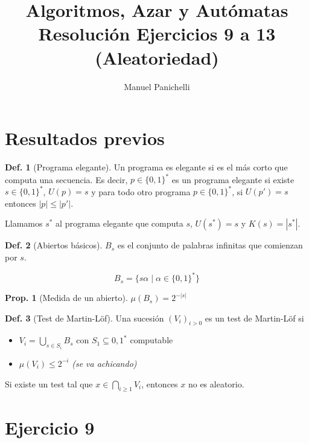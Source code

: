 \documentclass{article}
\author{Manuel Panichelli}
\title{Algoritmos, Azar y Autómatas\\Resolución Ejercicios 9 a 13 (Aleatoriedad)}
\theoremstyle{definition} %
\newtheorem{proposition}{Prop.}
\newtheorem{definition}{Def.}
\newcommand{\measure}[1]{\mu\left(#1\right)}
\newcommand{\sucML}{(V_i)_{i > 0}}
\newcommand{\ZOalphabet}{\{0, 1\}^*}
\begin{document}
\maketitle

\section*{Resultados previos}

\begin{definition}[Programa elegante]\label{def:prog-elegante}
    Un programa es elegante si es el más corto que computa una secuencia. Es
    decir, $p \in \ZOalphabet$ es un programa elegante si existe $s \in
    \ZOalphabet$, $U(p) = s$ y para todo otro programa $p \in \ZOalphabet$, si
    $U(p') = s$ entonces $|p| \leq |p'|$.

    Llamamos $s^*$ al programa elegante que computa $s$, $U(s^*) = s$ y $K(s) = |s^*|$.
\end{definition}

\begin{definition}[Abiertos básicos]
    $B_s$ es el conjunto de palabras infinitas que comienzan por $s$.

    \[B_s = \{ s \alpha \mid \alpha \in \{0, 1\}^* \}\]

\begin{proposition}[Medida de un abierto]
    $\measure{B_s} = 2^{-|s|}$
\end{proposition}
\end{definition}

\begin{definition}[Test de Martin-Löf]\label{def:martin-lof}
    Una sucesión $\sucML$ es un test de Martin-Löf si

    \begin{itemize}
        \item $V_i = \bigcup_{s \in S_i} B_s$ con $S_1 \subseteq {0, 1}^*$
        computable
        \item $\measure{V_i} \leq 2^{-i}$ \textit{(se va achicando)}
    \end{itemize}

    Si existe un test tal que $x \in \bigcap_{i \geq 1} V_i$, entonces $x$ no es
    aleatorio.
\end{definition}

\section*{Ejercicio 9}
\end{document}
